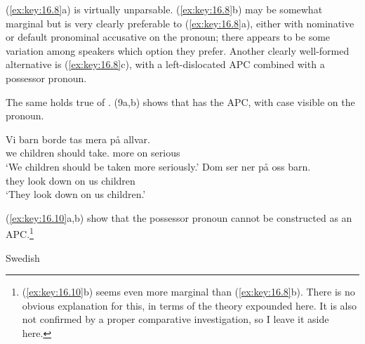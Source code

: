 \documentclass[output=paper]{langsci/langscibook}
\begin{document}
\ea\label{ex:key:16.8}
	\z
\z

(\ref{ex:key:16.8}a) is virtually unparsable. (\ref{ex:key:16.8}b) may be somewhat marginal but is very clearly
preferable to (\ref{ex:key:16.8}a), either with nominative or default
pronominal accusative on the pronoun; there appears to be some variation among
speakers which option they prefer. Another clearly well-formed alternative is
(\ref{ex:key:16.8}c), with a left-dislocated \gls{APC} combined with a possessor pronoun.

The same holds true of . (9a,b) shows that  has the \gls{APC}, with
case visible on the pronoun.

\ea\label{ex:key:16.9}
	\ea
		\gll Vi  barn  borde  tas  mera på allvar.\\
			we children should take.\Pass{} more on serious\\
		\glt    `We children should be taken more seriously.'
	\ex
		\gll Dom ser  ner  på oss barn.\\
			they  look down on us children\\
		\glt    `They look down on us children.'
	\z
\z

(\ref{ex:key:16.10}a,b) show that the possessor pronoun cannot be constructed as an
APC.\footnote{(\ref{ex:key:16.10}b) seems even more marginal than (\ref{ex:key:16.8}b). There is no obvious
explanation for this, in terms of the theory expounded here. It is also not
confirmed by a proper comparative investigation, so I leave it aside here.}

\ea Swedish\label{ex:key:16.10}
	\z
\z
\end{document}
